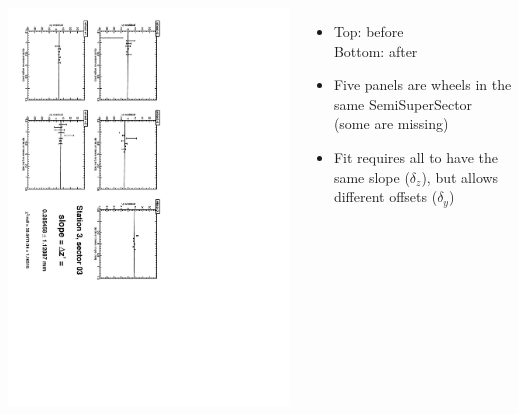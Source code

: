 \documentclass[compress]{beamer}
\begin{document}
\begin{frame}
\begin{columns}
\vfill
\includegraphics[height=\linewidth, angle=90]{zfits_after/zfit_3_03.pdf}
\begin{itemize}
\item Top: before \\ Bottom: after
\item Five panels are wheels in the same SemiSuperSector (some are missing)
\item Fit requires all to have the same slope ($\delta_z$), but allows different offsets ($\delta_y$)
\end{itemize}
\end{columns}
\end{frame}
\end{document}
